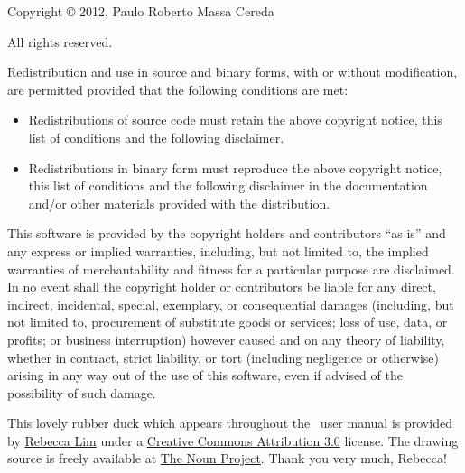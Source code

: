 \documentclass[a4paper,twoside,12pt]{memoir}
\begin{document}
{\setlength{\parindent}{0pt}
\ornamentline

\begin{center}
\scalebox{0.5}{\araralogo}

\slogan
\end{center}

\vspace{0.5em}

Copyright \copyright{} 2012, Paulo Roberto Massa Cereda

All rights reserved.

\vspace{1em}

Redistribution and use in source and binary forms, with or without modification, are permitted provided that the following conditions are met:

\begin{itemize}
\item Redistributions of source code must retain the above copyright notice, this list of conditions and the following disclaimer.
\item Redistributions in binary form must reproduce the above copyright notice, this list of conditions and the following disclaimer in the documentation and/or other materials provided with the distribution.
\end{itemize}

This software is provided by the copyright holders and contributors ``as is'' and any express or implied warranties, including, but not limited to, the implied warranties of merchantability and fitness for a particular purpose are disclaimed. In no event shall the copyright holder or contributors be liable for any direct, indirect, incidental, special, exemplary, or consequential damages (including, but not limited to, procurement of substitute goods or services; loss of use, data, or profits; or business interruption) however caused and on any theory of liability, whether in contract, strict liability, or tort (including negligence or otherwise) arising in any way out of the use of this software, even if advised of the possibility of such damage.

\ornamentline

\begin{center}
\rubberduck
\end{center}

This lovely rubber duck which appears throughout the \arara\ user manual is provided by \href{http://reblim.com}{Rebecca Lim} under a \href{https://creativecommons.org/licenses/by/3.0/us/}{Creative Commons Attribution 3.0} license. The drawing source is freely available at \href{https://thenounproject.com/term/rubber-duck/25368/}{The Noun Project}. Thank you very much, Rebecca!

}
\end{document}
